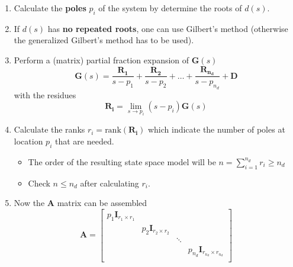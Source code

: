 \newpar{}
\begin{enumerate}
    \item Calculate the \textbf{poles} $p_i$ of the system by determine the roots of $d(s)$.
    \item If $d(s)$ has \textbf{no repeated roots}, one can use Gilbert's method (otherwise the generalized Gilbert's method has to be used).
    \item Perform a (matrix) partial fraction expansion of $\mathbf{G}(s)$
          \begin{equation*}
              \mathbf{G}(s)=\frac{\mathbf{R_1}}{s-p_1}+\frac{\mathbf{R_2}}{s-p_2}+\ldots+\frac{\mathbf{R_{n_d}}}{s-p_{n_d}}+\mathbf{D}
          \end{equation*} with the residues
          \begin{equation*}
              \mathbf{R_i}=\lim_{s\to p_i}(s-p_i)\mathbf{G}(s)
          \end{equation*}
    \item Calculate the ranks $r_i = \text{rank}(\mathbf{R_i})$ which indicate the number of poles at location $p_i$ that are needed.
          \begin{itemize}
              \item The order of the resulting state space model will be $n=\sum_{i=1}^{n_d}r_i\geq n_d$
              \item Check $n\le n_d$ after calculating $r_i$. %
          \end{itemize}
    \item Now the $\mathbf{A}$ matrix can be assembled
          \begin{equation*}
              \mathbf{A}  =\begin{bmatrix}
                  p_1 \mathbf{I}_{r_1\times r_1} &                                &        &                                            \\
                                                 & p_2 \mathbf{I}_{r_2\times r_2} &        &                                            \\
                                                 &                                & \ddots &                                            \\
                                                 &                                &        & p_{n_d} \mathbf{I}_{r_{n_d}\times r_{n_d}} \\
              \end{bmatrix}

\end{equation*}
\end{enumerate}
